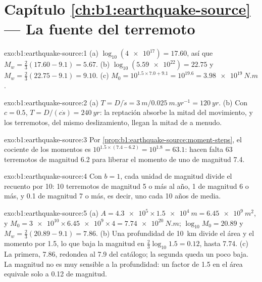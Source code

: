 \section*{Capítulo \ref{ch:b1:earthquake-source} --- La fuente del terremoto}

\begin{solution}{exo:b1:earthquake-source:1}
(a) $\log_{10}(\num{4e17}) = 17.60$, así que $M_w = \tfrac23(17.60 - 9.1) = 5.67$.
(b) $\log_{10}(\num{5.59e22}) = 22.75$ y $M_w = \tfrac23(22.75 - 9.1) =
9.10$. (c) $M_0 = 10^{1.5\times7.0 + 9.1} = 10^{19.6} = \qty{3.98e19}{N.m}$.
\end{solution}

\begin{solution}{exo:b1:earthquake-source:2}
(a) $T = D/\dot s = \qty{3}{m}/\qty{0.025}{m.yr^{-1}} = \qty{120}{yr}$.
(b) Con $c = 0.5$, $T = D/(c\dot s) = \qty{240}{yr}$: la reptación absorbe la mitad
del movimiento, y los terremotos, del mismo deslizamiento, llegan la mitad de a menudo.
\end{solution}

\begin{solution}{exo:b1:earthquake-source:3}
Por \cref{prop:b1:earthquake-source:moment-steps}, el cociente de los momentos es
$10^{1.5\times(7.4 - 6.2)} = 10^{1.8} = 63.1$: hacen falta 63 terremotos de
magnitud 6.2 para liberar el momento de uno de magnitud 7.4.
\end{solution}

\begin{solution}{exo:b1:earthquake-source:4}
Con $b = 1$, cada unidad de magnitud divide el recuento por 10: 10 terremotos de
magnitud 5 o más al año, 1 de magnitud 6 o más, y 0.1 de magnitud 7 o más, es decir, uno
cada 10 años de media.
\end{solution}

\begin{solution}{exo:b1:earthquake-source:5}
(a) $A = \num{4.3e5} \times \qty{1.5e4}{m} = \qty{6.45e9}{m^2}$, y
$M_0 = \num{3e10}\times\num{6.45e9}\times4 = \qty{7.74e20}{N.m}$;
$\log_{10}M_0 = 20.89$ y $M_w = \tfrac23(20.89 - 9.1) = 7.86$. (b) Una profundidad de
\qty{10}{km} divide el área y el momento por 1.5, lo que baja la magnitud en
$\tfrac23\log_{10}1.5 = 0.12$, hasta 7.74. (c) La primera, 7.86, redondea al
7.9 del catálogo; la segunda queda un poco baja. La magnitud no es muy sensible a la
profundidad: un factor de 1.5 en el área equivale solo a 0.12 de magnitud.
\end{solution}

